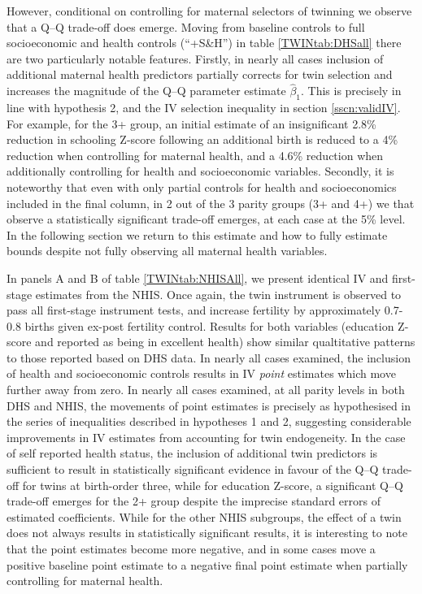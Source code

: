 \documentclass[subeqn]{article}
\begin{document}
\begin{spacing}{1.4}
However, conditional on controlling for maternal selectors of twinning we
observe that a Q--Q trade-off does emerge.  Moving from baseline controls to
full socioeconomic and health controls (``+S\&H'') in table
\ref{TWINtab:DHSall} there are two particularly notable features.  Firstly,
in nearly all cases inclusion of additional maternal health predictors
partially corrects for twin selection and increases the magnitude of the Q--Q
parameter estimate $\hat\beta_1$.  This is precisely in line with hypothesis
2, and the IV selection inequality in section \ref{sscn:validIV}. For
example, for the 3+ group, an initial estimate of an insignificant 2.8\%
reduction in schooling Z-score following an additional birth is reduced to a
4\% reduction when controlling for maternal health, and a 4.6\% reduction when
additionally controlling for health and socioeconomic variables.  Secondly, it
is noteworthy that even with only partial controls for health and
socioeconomics included in the final column, in 2 out of the 3 parity groups
(3+ and 4+) we that observe a statistically significant trade-off emerges,
at each case at the 5\% level.  In the following section we return to this
estimate and how to fully estimate bounds despite not fully observing all
maternal health variables.

In panels A and B of table \ref{TWINtab:NHISAll}, we present identical IV and
first-stage estimates from the NHIS.  Once again, the twin instrument is
observed to pass all first-stage instrument tests, and increase fertility by
approximately 0.7-0.8 births given ex-post fertility control.  Results for both
variables (education Z-score and reported as being in excellent health) show
similar qualtitative patterns to those reported based on DHS data.  In nearly
all cases examined, the inclusion of health and socioeconomic controls results
in IV \emph{point} estimates which move further away from zero. In nearly all
cases examined, at all parity levels in both DHS and NHIS, the movements of
point estimates is precisely as hypothesised in the series of inequalities
described in hypotheses 1 and 2, suggesting considerable improvements in IV
estimates from accounting for twin endogeneity.  In the case of self reported
health status, the inclusion of additional twin predictors is sufficient to
result in statistically significant evidence in favour of the Q--Q trade-off for
twins at birth-order three, while for education Z-score, a significant Q--Q
trade-off emerges for the 2+ group despite the imprecise standard errors of
estimated coefficients. While for the other NHIS subgroups, the effect of a
twin does not always results in statistically significant results, it is
interesting to note that the point estimates become more negative, and in
some cases move a positive baseline point estimate to a negative final point
estimate when partially controlling for maternal health.


\end{spacing}
\end{document}
